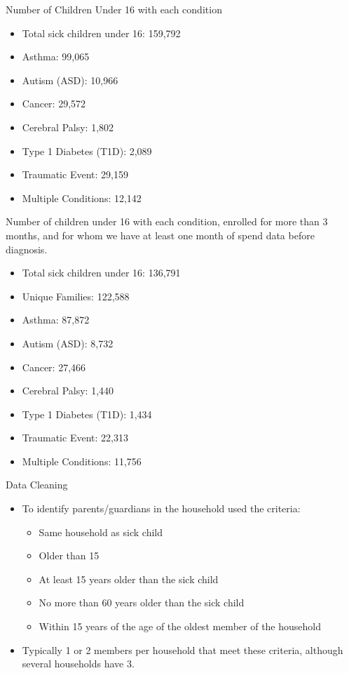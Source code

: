 \documentclass[xcolor=x11names,compress]{beamer}
\renewcommand{\(}{\begin{columns}}
\renewcommand{\)}{\end{columns}}
\newcommand{\<}[1]{\begin{column}{#1}}
\renewcommand{\>}{\end{column}}
\begin{document}
\begin{frame}{Number of Children Under 16 with each condition}
\begin{itemize}
	\item Total sick children under 16: 159,792 
	\item Asthma:  99,065
	\item Autism (ASD): 10,966 
	\item Cancer: 29,572
	\item Cerebral Palsy: 1,802
	\item Type 1 Diabetes (T1D): 2,089
	\item Traumatic Event: 29,159
	\item Multiple Conditions: 12,142
\end{itemize}	
\end{frame}

\begin{frame}
Number of children under 16 with each condition, enrolled for more than 3 months, and for whom we have at least one month of spend data before diagnosis. 
\begin{itemize}
	\item Total sick children under 16: 136,791
	\item Unique Families: 122,588 
	\item Asthma:  87,872
	\item Autism (ASD): 8,732
	\item Cancer: 27,466
	\item Cerebral Palsy: 1,440
	\item Type 1 Diabetes (T1D): 1,434
	\item Traumatic Event: 22,313
	\item Multiple Conditions: 11,756
\end{itemize}	
\end{frame}

\begin{frame}{Data Cleaning }
\begin{itemize}
	\item To identify parents/guardians in the household used the criteria:
		\begin{itemize}
			\item Same household as sick child
			\item Older than 15
			\item At least 15 years older than the sick child 
			\item No more than 60 years older than the sick child
			\item Within 15 years of the age of the oldest member of the household
		\end{itemize} 
	\item Typically 1 or 2 members per household that meet these criteria, although several households have 3. 
\end{itemize}
\end{frame}
\end{document}
